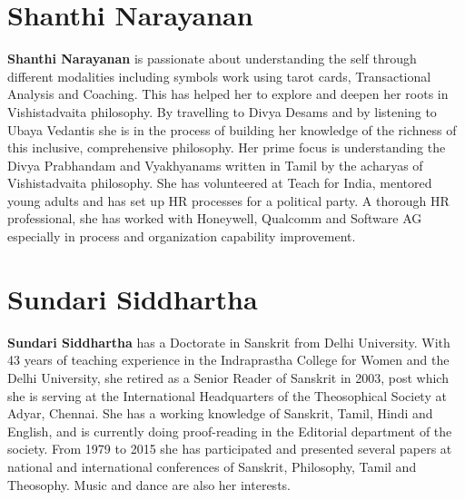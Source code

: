 \section*{Shanthi Narayanan}

\textbf{Shanthi Narayanan} is passionate about understanding the self through different modalities including symbols work using tarot cards, Transactional Analysis and Coaching. This has helped her to explore and deepen her roots in Vishistadvaita philosophy. By travelling to Divya Desams and by listening to Ubaya Vedantis she is in the process of building her knowledge of the richness of this inclusive, comprehensive philosophy. Her prime focus is understanding the Divya Prabhandam and Vyakhyanams written in Tamil by the acharyas of Vishistadvaita philosophy. She has volunteered at Teach for India, mentored young adults and has set up HR processes for a political party. A thorough HR professional, she has worked with Honeywell, Qualcomm and Software AG especially in process and organization capability improvement.

\section*{Sundari Siddhartha}

\textbf{Sundari Siddhartha} has a Doctorate in Sanskrit from Delhi University. With 43 years of teaching experience in the Indraprastha College for Women and the Delhi University, she retired as a Senior Reader of Sanskrit in 2003, post which she is serving at the International Headquarters of the Theosophical Society at Adyar, Chennai. She has a working knowledge of Sanskrit, Tamil, Hindi and English, and is currently doing proof-reading in the Editorial department of the society. From 1979 to 2015 she has participated and presented several papers at national and international conferences of Sanskrit, Philosophy, Tamil and Theosophy. Music and dance are also her interests.

